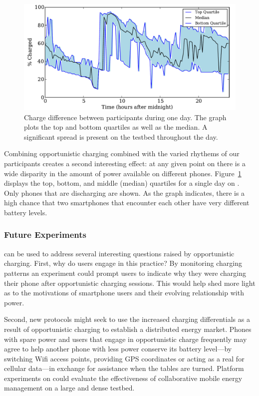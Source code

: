 \begin{figure}[t]
\includegraphics[width=\textwidth]{./figures/power/opportunistic_charging/max_difference/graph.pdf}
\caption{Charge difference between participants during one day.
\textnormal{The graph plots the top and bottom quartiles as well as the
median. A significant spread is present on the testbed throughout the day.}}
\label{fig-opportunisticspread}
\end{figure}

Combining opportunistic charging combined with the varied rhythems of our
participants creates a second interesting effect: at any given point on
\PhoneLab{} there is a wide disparity in the amount of power available on
different phones. Figure~\ref{fig-opportunisticspread} displays the top,
bottom, and middle (median) quartiles for a single day on \PhoneLab{}. Only
phones that are discharging are shown. As the graph indicates, there is a
high chance that two smartphones that encounter each other have very
different battery levels.

\subsubsection{Future Experiments}

\PhoneLab{} can be used to address several interesting questions raised by
opportunistic charging. First, why do users engage in this practice? By
monitoring charging patterns an experiment could prompt users to indicate why
they were charging their phone after opportunistic charging sessions. This
would help shed more light as to the motivations of smartphone users and
their evolving relationship with power.

Second, new protocols might seek to use the increased charging differentials
as a result of opportunistic charging to establish a distributed energy
market. Phones with spare power and users that engage in opportunistic charge
frequently may agree to help another phone with less power conserve its
battery level---by switching Wifi access points, providing GPS coordinates or
acting as a real for cellular data---in exchange for assistance when the
tables are turned. Platform experiments on \PhoneLab{} could evaluate the
effectiveness of collaborative mobile energy management on a large and dense
testbed.

